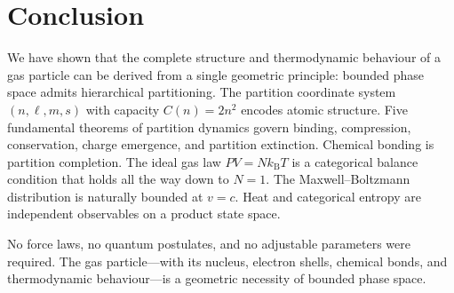 \documentclass[twocolumn,10pt,a4paper]{article}
\theoremstyle{plain}
\theoremstyle{definition}
\theoremstyle{remark}
\newcommand{\kB}{k_{\mathrm{B}}}
\begin{document}
\section{Conclusion}
\label{sec:conclusion}

We have shown that the complete structure and thermodynamic behaviour of a gas particle can be derived from a single geometric principle: bounded phase space admits hierarchical partitioning. The partition coordinate system $(n, \ell, m, s)$ with capacity $C(n) = 2n^2$ encodes atomic structure. Five fundamental theorems of partition dynamics govern binding, compression, conservation, charge emergence, and partition extinction. Chemical bonding is partition completion. The ideal gas law $PV = N\kB T$ is a categorical balance condition that holds all the way down to $N = 1$. The Maxwell--Boltzmann distribution is naturally bounded at $v = c$. Heat and categorical entropy are independent observables on a product state space.

No force laws, no quantum postulates, and no adjustable parameters were required. The gas particle---with its nucleus, electron shells, chemical bonds, and thermodynamic behaviour---is a geometric necessity of bounded phase space.



\end{document}
